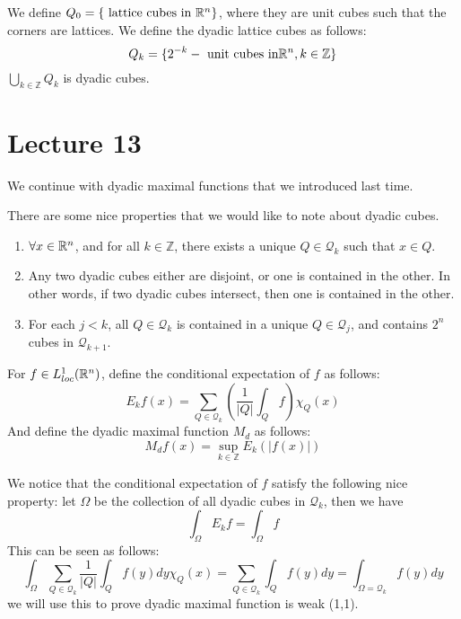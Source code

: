 \begin{definition}
    We define $Q_0=\{\text{ lattice cubes in } \mathbb{R}^n\}$, where they are unit cubes such that the corners are lattices. We define the dyadic lattice cubes as follows:
    \begin{equation*}
        Q_k=\{ 2^{-k}-\text{ unit cubes in} \mathbb{R}^n, k\in\mathbb{Z}\}
    \end{equation*}
    $\bigcup_{k\in\mathbb{Z}}Q_k$ is dyadic cubes.
\end{definition}

\section{Lecture 13}
We continue with dyadic maximal functions that we introduced last time.

There are some nice properties that we would like to note about dyadic cubes.
\begin{enumerate}
    \item $\forall x\in\mathbb{R}^n$, and for all $k\in\mathbb{Z}$, there exists a unique $Q\in\mathcal{Q}_k$ such that $x\in Q$.
    \item Any two dyadic cubes either are disjoint, or one is contained in the other. In other words, if two dyadic cubes intersect, then one is contained in the other.
    \item For each $j<k$, all $Q\in\mathcal{Q}_k$ is contained in a unique $Q\in\mathcal{Q}_j$, and contains $2^n$ cubes in $\mathcal{Q}_{k+1}$.
\end{enumerate}

\begin{definition}
    For $f\in L_{loc}^1(\mathbb{R}^n)$, define the conditional expectation of $f$ as follows:
    \begin{equation*}
        E_kf(x)=\sum_{Q\in \mathcal{Q}_k}\left(\frac{1}{|Q|}\int_Qf\right)\chi_{Q}(x)
    \end{equation*}
    And define the dyadic maximal function $M_d$ as follows:
    \begin{equation*}
        M_df(x)=\sup_{k\in\mathbb{Z}}E_k(|f(x)|)
    \end{equation*}

\end{definition}
\begin{note}
    We notice that the conditional expectation of $f$ satisfy the following nice property: let $\Omega$ be the collection of all dyadic cubes in $\mathcal{Q}_k$, then we have
    \begin{equation*}
        \int_\Omega E_kf=\int_\Omega f
    \end{equation*}
    This can be seen as follows:
    \begin{equation}
        \int_\Omega \sum_{Q\in\mathcal{Q}_k}\frac{1}{|Q|}\int_Qf(y)dy\chi_Q(x)=\sum_{Q\in\mathcal{Q}_k}\int_Qf(y)dy=\int_{\Omega=\mathcal{Q}_k}f(y)dy
    \end{equation}
    we will use this to prove dyadic maximal function is weak (1,1).
\end{note}

